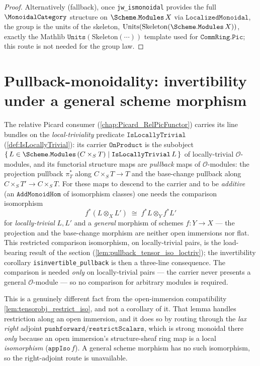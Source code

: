 \begin{proof}
  Alternatively (fallback), once \texttt{jw\_ismonoidal} provides the full
  \(\MonoidalCategory\) structure on \(\Scheme.\mathtt{Modules}\,X\) via
  \(\mathtt{LocalizedMonoidal}\), the group is the units of the skeleton,
  \(\mathrm{Units}(\mathrm{Skeleton}(\Scheme.\mathtt{Modules}\,X))\), exactly the
  Mathlib \(\mathtt{Units}(\mathrm{Skeleton}(\cdots))\) template used for
  \(\mathtt{CommRing.Pic}\); this route is not needed for the group law.
\end{proof}

\section{Pullback-monoidality: invertibility under a general scheme morphism}
\label{sec:tensorobj_pullback_monoidality}

The relative Picard consumer (\cref{chap:Picard_RelPicFunctor}) carries its line
bundles on the \emph{local-triviality} predicate \(\mathtt{IsLocallyTrivial}\)
(\cref{def:IsLocallyTrivial}): its carrier \(\mathtt{OnProduct}\) is the
subobject \(\{\,L \in \Scheme.\mathtt{Modules}\,(C \times_S T) \mid
\mathtt{IsLocallyTrivial}\,L\,\}\) of locally-trivial \(\mathcal{O}\)-modules, and
its functorial structure maps are \emph{pullback} maps of \(\mathcal{O}\)-modules:
the projection pullback \(\pi_T^*\) along \(C \times_S T \to T\) and the
base-change pullback along \(C \times_S T' \to C \times_S T\). For these maps to
descend to the carrier and to be \emph{additive} (an \(\mathtt{AddMonoidHom}\) of
isomorphism classes) one needs the comparison isomorphism
\[
  f^*(L \otimes_X L')
    \;\cong\;
  f^*L \otimes_Y f^*L'
\]
for \emph{locally-trivial} \(L, L'\) and a \emph{general} morphism of schemes
\(f : Y \to X\) --- the projection and the base-change morphism are neither open
immersions nor flat. This restricted comparison isomorphism, on locally-trivial
pairs, is the load-bearing result of the section
(\cref{lem:pullback_tensor_iso_loctriv}); the invertibility corollary
\texttt{isinvertible\_pullback} is then a three-line consequence. The comparison
is needed \emph{only} on locally-trivial pairs --- the carrier never presents a
general \(\mathcal{O}\)-module --- so no comparison for arbitrary modules is
required.

This is a genuinely different fact from the open-immersion compatibility
\cref{lem:tensorobj_restrict_iso}, and not a corollary of it. That lemma handles
restriction along an open immersion, and it does so by routing through the
\emph{lax right} adjoint \(\mathtt{pushforward}/\mathtt{restrictScalars}\), which is
strong monoidal there \emph{only} because an open immersion's structure-sheaf ring
map is a local \emph{isomorphism} (\(\mathtt{appIso}\,f\)). A general scheme
morphism has no such isomorphism, so the right-adjoint route is unavailable.

